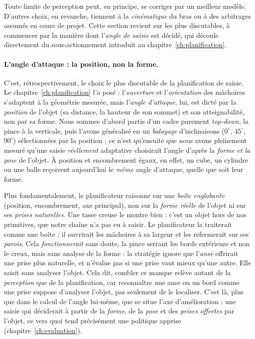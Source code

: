 Toute limite de perception peut, en principe, se corriger par un meilleur modèle. D'autres choix, en revanche, tiennent à la \emph{cinématique} du bras ou à des arbitrages assumés en cours de projet. Cette section revient sur les plus discutables, à commencer par la manière dont l'\emph{angle de saisie} est décidé, qui découle directement du sous-actionnement introduit au chapitre~\ref{ch:planification}.

\paragraph{L'angle d'attaque : la position, non la forme.}
C'est, rétrospectivement, le choix le plus discutable de la planification de saisie. Le chapitre~\ref{ch:planification} l'a posé : l'\emph{ouverture} et l'\emph{orientation} des mâchoires s'adaptent à la géométrie mesurée, mais l'\emph{angle d'attaque}, lui, est dicté par la \emph{position} de l'objet (sa distance, la hauteur de son sommet) et son atteignabilité, non par sa forme. Nous sommes d'abord partis d'un cadre purement \emph{top-down}, la pince à la verticale, puis l'avons généralisé en un \emph{balayage} d'inclinaisons ($0^{\circ}$, $45^{\circ}$, $90^{\circ}$) sélectionnées par la position ; ce n'est qu'ensuite que nous avons pleinement mesuré qu'une saisie \emph{réellement} adaptative choisirait l'angle d'après la \emph{forme et la pose} de l'objet. À position et encombrement égaux, en effet, un cube, un cylindre ou une balle reçoivent aujourd'hui le \emph{même} angle d'attaque, quelle que soit leur forme.

Plus fondamentalement, le planificateur raisonne sur une \emph{boîte englobante} (position, encombrement, axe principal), non sur la \emph{forme réelle} de l'objet ni sur ses \emph{prises naturelles}. Une tasse creuse le montre bien : c'est un objet hors de nos primitives, que notre chaîne n'a pas eu à saisir. Le planificateur la traiterait comme une boîte : il ouvrirait les mâchoires à sa largeur et les refermerait sur ses \emph{parois}. Cela \emph{fonctionnerait} sans doute, la pince serrant les bords extérieurs et non le creux, mais sans analyse de la forme : la stratégie ignore que l'\emph{anse} offrirait une prise plus naturelle, et n'évalue pas si une prise vaut mieux qu'une autre. Elle saisit sans analyser l'objet. Cela dit, combler ce manque relève autant de la \emph{perception} que de la planification, car reconnaître une anse ou un bord comme une prise suppose d'analyser l'objet, pas seulement de le localiser. C'est là, plus que dans le calcul de l'angle lui-même, que se situe l'axe d'amélioration : une saisie qui déciderait à partir de la \emph{forme}, de la \emph{pose} et des \emph{prises offertes} par l'objet, ce vers quoi tend précisément une politique apprise (chapitre~\ref{ch:evaluation}).

